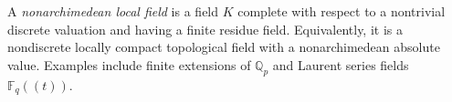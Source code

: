 
A \emph{nonarchimedean local field} is a field $K$ complete with respect to a nontrivial discrete valuation and having a finite residue field. Equivalently, it is a nondiscrete locally compact topological field with a nonarchimedean absolute value. Examples include finite extensions of $\mathbb Q_p$ and Laurent series fields $\mathbb F_q((t))$.
